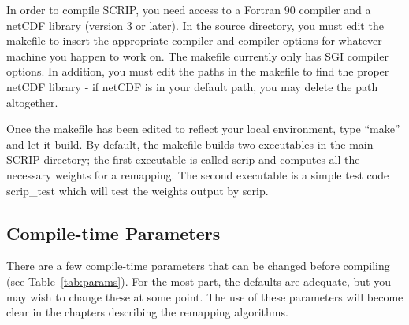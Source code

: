 \documentclass[12pt]{report}
\begin{document}
In order to compile SCRIP, you need access to a
Fortran 90 compiler and a netCDF library (version 3 or
later).  In the source directory, you must edit the
makefile to insert the appropriate compiler and compiler
options for whatever machine you happen to work on.  The
makefile currently only has SGI compiler options.  In
addition, you must edit the paths in the makefile to
find the proper netCDF library - if netCDF is in your
default path, you may delete the path altogether.

Once the makefile has been edited to reflect your
local environment, type ``make'' and let it
build.  By default, the makefile builds two executables
in the main SCRIP directory;
the first executable is called scrip and computes
all the necessary weights for a remapping.  The second
executable is a simple test code scrip\_test which will
test the weights output by scrip.

\subsection{Compile-time Parameters}

There are a few compile-time parameters that can
be changed before compiling (see Table~\ref{tab:params}).
For the most part, the
defaults are adequate, but you may wish to change
these at some point.  The use of these parameters
will become clear in the chapters describing the
remapping algorithms.
\end{document}
